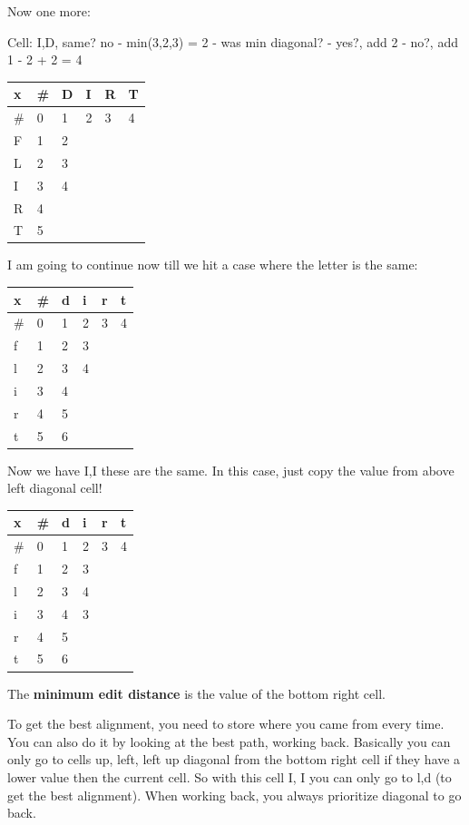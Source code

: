 \documentclass[
  11pt,
  british,
]{article}
\begin{document}
Now one more:

Cell: I,D, same? no - min(3,2,3) = 2 - was min diagonal? - yes?, add 2 -
no?, add 1 - 2 + 2 = 4

\begin{longtable}[]{@{}llllll@{}}
\toprule
x & \# & D & I & R & T \\
\midrule
\endhead
\# & 0 & 1 & 2 & 3 & 4 \\
F & 1 & 2 & & & \\
L & 2 & 3 & & & \\
I & 3 & 4 & & & \\
R & 4 & & & & \\
T & 5 & & & & \\
\bottomrule
\end{longtable}

I am going to continue now till we hit a case where the letter is the
same:

\begin{longtable}[]{@{}llllll@{}}
\toprule
x & \# & d & i & r & t \\
\midrule
\endhead
\# & 0 & 1 & 2 & 3 & 4 \\
f & 1 & 2 & 3 & & \\
l & 2 & 3 & 4 & & \\
i & 3 & 4 & & & \\
r & 4 & 5 & & & \\
t & 5 & 6 & & & \\
\bottomrule
\end{longtable}

Now we have I,I these are the same. In this case, just copy the value
from above left diagonal cell!

\begin{longtable}[]{@{}llllll@{}}
\toprule
x & \# & d & i & r & t \\
\midrule
\endhead
\# & 0 & 1 & 2 & 3 & 4 \\
f & 1 & 2 & 3 & & \\
l & 2 & 3 & 4 & & \\
i & 3 & 4 & 3 & & \\
r & 4 & 5 & & & \\
t & 5 & 6 & & & \\
\bottomrule
\end{longtable}

The \textbf{minimum edit distance} is the value of the bottom right
cell.

To get the best alignment, you need to store where you came from every
time. You can also do it by looking at the best path, working back.
Basically you can only go to cells up, left, left up diagonal from the
bottom right cell if they have a lower value then the current cell. So
with this cell I, I you can only go to l,d (to get the best alignment).
When working back, you always prioritize diagonal to go back.
\end{document}

